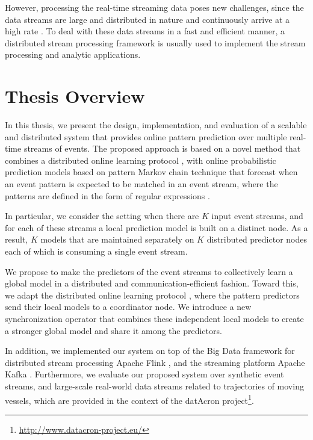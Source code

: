 \par However, processing the real-time streaming data poses new challenges, since the data streams are large and distributed in nature and continuously arrive at a high rate \cite{Babcock2002,Flouris2017}. To deal with these data streams in a fast and efficient manner, a distributed stream processing framework \cite{Spark,Flink,Storm} is usually used to implement the stream processing and analytic applications. 


\section{Thesis Overview}
\par In this thesis, we present the design, implementation, and evaluation of a scalable and distributed system that provides online pattern prediction over multiple real-time streams of events. The proposed approach is based on a novel method that combines a distributed online learning protocol \cite{kamp2014communication}, with online probabilistic prediction models based on pattern Markov chain technique \cite{alevizos2017event} that forecast when an event pattern is expected to be matched in an event stream, where the patterns are defined in the form of regular expressions . 

\par In particular, we consider the setting when there are \emph{$K$} input event streams, and for each of these streams a local prediction model is built on a distinct node. As a result, \emph{$K$} models that are maintained separately on \emph{$K$} distributed predictor nodes each of which is consuming a single event stream.


 \par We propose to make the predictors of the event streams to collectively learn a global model in a distributed and communication-efficient fashion. Toward this, we adapt the distributed online learning protocol \cite{kamp2014communication}, where the pattern predictors \cite{alevizos2017event} send their local models to a coordinator node. We introduce a new synchronization operator that combines these independent local models to create a stronger global model and share it among the predictors.
  

\par In addition, we implemented our system on top of the Big Data framework for distributed stream processing Apache Flink \cite{Flink}, and the streaming platform Apache Kafka \cite{Kafka}. Furthermore, we evaluate our proposed system over synthetic event streams, and large-scale real-world data streams related to trajectories of moving vessels, which are provided in the context of the datAcron project\footnote{\url{http://www.datacron-project.eu/}}.\\

